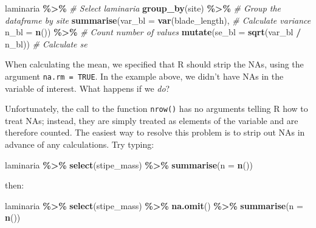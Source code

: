 \documentclass[
]{book}
\newenvironment{Shaded}{\begin{snugshade}}{\end{snugshade}}
\newcommand{\CommentTok}[1]{\textcolor[rgb]{0.56,0.35,0.01}{\textit{#1}}}
\newcommand{\DataTypeTok}[1]{\textcolor[rgb]{0.13,0.29,0.53}{#1}}
\newcommand{\KeywordTok}[1]{\textcolor[rgb]{0.13,0.29,0.53}{\textbf{#1}}}
\newcommand{\NormalTok}[1]{#1}
\newcommand{\OperatorTok}[1]{\textcolor[rgb]{0.81,0.36,0.00}{\textbf{#1}}}
\newcommand{\StringTok}[1]{\textcolor[rgb]{0.31,0.60,0.02}{#1}}
\begin{document}
\begin{Shaded}
\begin{Highlighting}[]
\NormalTok{laminaria }\OperatorTok{\%>\%}\StringTok{ }\CommentTok{\# Select \textquotesingle{}laminaria\textquotesingle{}}
\StringTok{  }\KeywordTok{group\_by}\NormalTok{(site) }\OperatorTok{\%>\%}\StringTok{ }\CommentTok{\# Group the dataframe by site}
\StringTok{  }\KeywordTok{summarise}\NormalTok{(}\DataTypeTok{var\_bl =} \KeywordTok{var}\NormalTok{(blade\_length), }\CommentTok{\# Calculate variance}
            \DataTypeTok{n\_bl =} \KeywordTok{n}\NormalTok{()) }\OperatorTok{\%>\%}\StringTok{  }\CommentTok{\# Count number of values}
\StringTok{  }\KeywordTok{mutate}\NormalTok{(}\DataTypeTok{se\_bl =} \KeywordTok{sqrt}\NormalTok{(var\_bl }\OperatorTok{/}\StringTok{ }\NormalTok{n\_bl)) }\CommentTok{\# Calculate se}
\end{Highlighting}
\end{Shaded}

When calculating the mean, we specified that R should strip the NAs, using the argument \texttt{na.rm\ =\ TRUE}. In the example above, we didn't have NAs in the variable of interest. What happens if we \emph{do}?

Unfortunately, the call to the function \texttt{nrow()} has no arguments telling R how to treat NAs; instead, they are simply treated as elements of the variable and are therefore counted. The easiest way to resolve this problem is to strip out NAs in advance of any calculations. Try typing:

\begin{Shaded}
\begin{Highlighting}[]
\NormalTok{laminaria }\OperatorTok{\%>\%}\StringTok{ }
\StringTok{  }\KeywordTok{select}\NormalTok{(stipe\_mass) }\OperatorTok{\%>\%}\StringTok{ }
\StringTok{  }\KeywordTok{summarise}\NormalTok{(}\DataTypeTok{n =} \KeywordTok{n}\NormalTok{())}
\end{Highlighting}
\end{Shaded}

then:

\begin{Shaded}
\begin{Highlighting}[]
\NormalTok{laminaria }\OperatorTok{\%>\%}\StringTok{ }
\StringTok{  }\KeywordTok{select}\NormalTok{(stipe\_mass) }\OperatorTok{\%>\%}\StringTok{ }
\StringTok{  }\KeywordTok{na.omit}\NormalTok{() }\OperatorTok{\%>\%}\StringTok{ }
\StringTok{  }\KeywordTok{summarise}\NormalTok{(}\DataTypeTok{n =} \KeywordTok{n}\NormalTok{())}
\end{Highlighting}
\end{Shaded}
\end{document}
